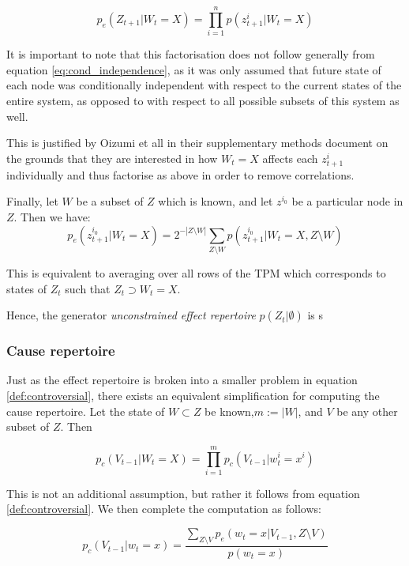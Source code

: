 \begin{equation}
\label{def:controversial}
p_e(Z_{t+1}|W_t = X) = \prod \limits_{i= 1}^n p(z^i_{t+1}|W_t = X)
\end{equation}

It is important to note that this factorisation does not follow generally from equation \ref{eq:cond_independence}, as it was only assumed that future state of each node was conditionally independent with respect to the current states of the entire system, as opposed to with respect to all possible subsets of this system as well.

This is justified by Oizumi et all \cite{main} in their supplementary methods document on the grounds that they are interested in how $W_t=X$ affects each $z^i_{t+1}$ individually and thus factorise as above in order to remove correlations.


Finally, let $W$ be a subset of $Z$ which is known, and let $z^{i_0}$ be a particular node in $Z$. Then we have:
\begin{equation}
\label{def:effect_repertoire}
p_e(z_{t+1}^{i_0}|W_t = X) = 2^{-|Z\setminus W|}\sum \limits_{Z\setminus W} p(z_{t+1}^{i_0}|W_t = X, Z\setminus W)
\end{equation}

This is equivalent to averaging over all rows of the TPM which corresponds to states of $Z_t$ such that $Z_t \supset W_t = X$.

Hence, the generator \textit{unconstrained effect repertoire} $p(Z_t | \emptyset)$ is s

\subsubsection{Cause repertoire}

Just as the effect repertoire is broken into a smaller problem in equation \ref{def:controversial}, there exists an equivalent simplification for computing the cause repertoire. Let the state of $W \subset Z$ be known,$m:=|W|$, and $V$ be any other subset of $Z$. Then 

\begin{equation}
\label{def:cause_rep1}
p_c(V_{t-1} | W_t=X) = \prod \limits_{i = 1}^{m} p_c(V_{t-1}|w^i_{t} = x^i)
\end{equation}

This is not an additional assumption, but rather it follows from equation \ref{def:controversial}. We then complete the computation as follows:


\begin{equation}
\label{def:cause_rep2}
p_c(V_{t-1}| w_t = x) = \frac{\sum \limits_{Z\setminus V} p_e(w_t = x| V_{t-1}, Z \setminus V)}{p(w_t = x)}
\end{equation}


